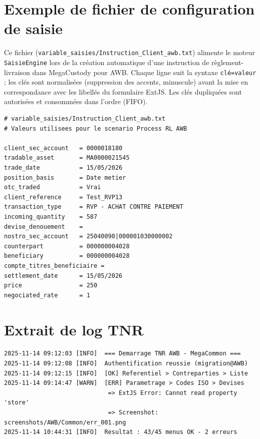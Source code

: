 \documentclass[12pt, a4paper]{report}
\begin{document}
\appendix

\chapter{Exemple de fichier de configuration de saisie}

Ce fichier (\texttt{variable\_saisies/Instruction\_Client\_awb.txt}) alimente le moteur \texttt{SaisieEngine} lors de la création automatique d'une instruction de règlement-livraison dans MegaCustody pour AWB. Chaque ligne suit la syntaxe \texttt{clé=valeur} ; les clés sont normalisées (suppression des accents, minuscule) avant la mise en correspondance avec les libellés du formulaire ExtJS. Les clés dupliquées sont autorisées et consommées dans l'ordre (FIFO).

\begin{mdframed}[backgroundcolor=codeGray, linewidth=0pt, innerleftmargin=8pt]
\begin{verbatim}
# variable_saisies/Instruction_Client_awb.txt
# Valeurs utilisees pour le scenario Process RL AWB

client_sec_account   = 0000018180
tradable_asset       = MA0000021545
trade_date           = 15/05/2026
position_basis       = Date metier
otc_traded           = Vrai
client_reference     = Test_RVP13
transaction_type     = RVP - ACHAT CONTRE PAIEMENT
incoming_quantity    = 587
devise_denouement    =
nostro_sec_account   = 25040090|000001030000002
counterpart          = 000000004028
beneficiary          = 000000004028
compte_titres_beneficiaire =
settlement_date      = 15/05/2026
price                = 250
negociated_rate      = 1
\end{verbatim}
\end{mdframed}

\chapter{Extrait de log TNR}
\begin{mdframed}[backgroundcolor=codeGray, linewidth=0pt]
\begin{verbatim}
2025-11-14 09:12:03 [INFO]  === Demarrage TNR AWB - MegaCommon ===
2025-11-14 09:12:08 [INFO]  Authentification reussie (migration@AWB)
2025-11-14 09:12:15 [INFO]  [OK] Referentiel > Contreparties > Liste
2025-11-14 09:14:47 [WARN]  [ERR] Parametrage > Codes ISO > Devises
                             => ExtJS Error: Cannot read property 'store'
                             => Screenshot: screenshots/AWB/Common/err_001.png
2025-11-14 10:44:31 [INFO]  Resultat : 43/45 menus OK - 2 erreurs
\end{verbatim}
\end{mdframed}
\end{document}
